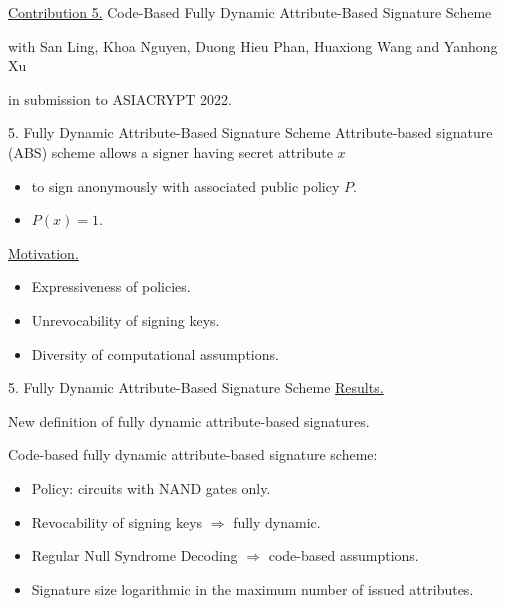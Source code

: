 \begin{frame}
	\underline{Contribution 5.} Code-Based Fully Dynamic Attribute-Based Signature Scheme
	
	{\small with San Ling, Khoa Nguyen, Duong Hieu Phan, Huaxiong Wang and Yanhong Xu}
	
	in submission to ASIACRYPT 2022.
\end{frame}

\begin{frame}{5. Fully Dynamic Attribute-Based Signature Scheme}
	Attribute-based signature (ABS) scheme allows a signer having secret attribute $x$\pause
	\begin{itemize}
		\item to sign anonymously with associated public policy $P$.\pause
		\item $P(x) = 1$.\pause
	\end{itemize}
	
	\underline{Motivation.}\pause
	\begin{itemize}
		\item Expressiveness of policies.\pause
		\item Unrevocability of signing keys.\pause
		\item Diversity of computational assumptions.
	\end{itemize}
\end{frame}

\begin{frame}{5. Fully Dynamic Attribute-Based Signature Scheme}
	\underline{Results.} \pause
	
	New definition of fully dynamic attribute-based signatures.\pause
	
	Code-based fully dynamic attribute-based signature scheme:\pause
	\begin{itemize}
		\item Policy: circuits with NAND gates only.\pause
		\item Revocability of signing keys $\Rightarrow$ fully dynamic.\pause
		\item Regular Null Syndrome Decoding $\Rightarrow$ code-based assumptions.\pause
		\item Signature size logarithmic in the maximum number of issued attributes.
	\end{itemize}
\end{frame}

